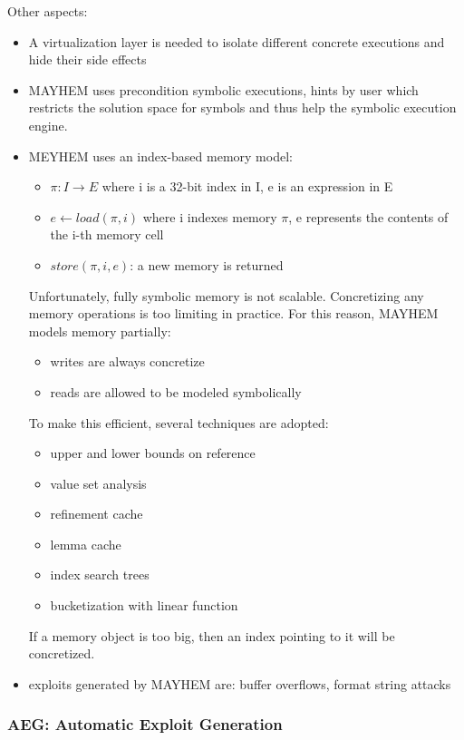 Other aspects:
\begin{itemize}
  \item A virtualization layer is needed to isolate different concrete executions and hide their side effects
  \item MAYHEM uses precondition symbolic executions, hints by user which restricts the solution space for symbols and thus help the symbolic execution engine.
  \item MEYHEM uses an index-based memory model:
    \begin{itemize}
      \item $\pi : I \to E$ where i is a 32-bit index in I, e is an expression in E 
      \item $e \gets load(\pi, i)$ where i indexes memory $\pi$, e represents the contents of the i-th memory cell
      \item $store(\pi, i, e)$: a new memory is returned
    \end{itemize}
    Unfortunately, fully symbolic memory is not scalable. Concretizing any memory operations is too limiting in practice. For this reason, MAYHEM models memory partially:
    \begin{itemize}
      \item writes are always concretize
      \item reads are allowed to be modeled symbolically
    \end{itemize}
    To make this efficient, several techniques are adopted: 
    \begin{itemize}
      \item upper and lower bounds on reference
      \item value set analysis
      \item refinement cache
      \item lemma cache
      \item index search trees
      \item bucketization with linear function
    \end{itemize}
    If a memory object is too big, then an index pointing to it will be concretized.
  \item exploits generated by MAYHEM are: buffer overflows, format string attacks
\end{itemize}

\subsubsection{\cite{AEG-NDSS11} AEG: Automatic Exploit Generation} 

